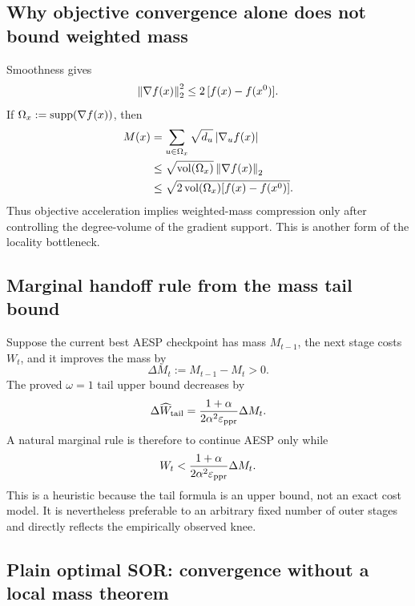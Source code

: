 \subsection{Why objective convergence alone does not bound weighted mass}

Smoothness gives
\begin{equation}
    \left\lVert \nabla f(x)\right\rVert_2^2
    \leq2\,[f(x)-f(x^0)].
    \label{eq:gradient-gap-upper}
\end{equation}
If \(\Omega_x:=\operatorname{supp}(\nabla f(x))\), then
\begin{align}
    M(x)
    &=\sum_{u\in\Omega_x}\sqrt{d_u}\left\lvert \nabla_u f(x)\right\rvert
    \notag\\
    &\leq
    \sqrt{\operatorname{vol}(\Omega_x)}\left\lVert \nabla f(x)\right\rVert_2
    \notag\\
    &\leq
    \sqrt{2\operatorname{vol}(\Omega_x)[f(x)-f(x^0)]}.
    \label{eq:mass-from-gap}
\end{align}
Thus objective acceleration implies weighted-mass compression only after
controlling the degree-volume of the gradient support.  This is another form
of the locality bottleneck.

\subsection{Marginal handoff rule from the mass tail bound}

Suppose the current best AESP checkpoint has mass \(M_{t-1}\), the next stage
costs \(W_t\), and it improves the mass by
\begin{equation}
    \Delta M_t:=M_{t-1}-M_t>0.
    \label{eq:mass-improvement}
\end{equation}
The proved \(\omega=1\) tail upper bound decreases by
\begin{equation}
    \Delta \widehat W_{\rm tail}
    =\frac{1+\alpha}{2\alpha^2\varepsilon_{\mathrm{ppr}}}\Delta M_t.
    \label{eq:predicted-work-saved}
\end{equation}
A natural marginal rule is therefore to continue AESP only while
\begin{equation}
    W_t
    <
    \frac{1+\alpha}{2\alpha^2\varepsilon_{\mathrm{ppr}}}\Delta M_t.
    \label{eq:marginal-switch}
\end{equation}
This is a heuristic because the tail formula is an upper bound, not an exact
cost model.  It is nevertheless preferable to an arbitrary fixed number of
outer stages and directly reflects the empirically observed knee.

\subsection{Plain optimal SOR: convergence without a local mass theorem}

